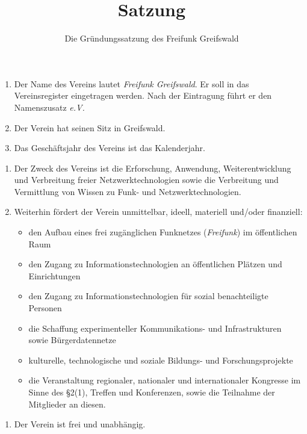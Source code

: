 \documentclass[parskip=half]{scrartcl}
\begin{document}
	\title{Satzung} 
	\author{Die Gründungssatzung des Freifunk Greifswald}
	\date{}
	\maketitle
	\begin{contract}
		\begin{enumerate}
			\item Der Name des Vereins lautet \textit{Freifunk Greifswald}. Er soll in das Vereinsregister eingetragen werden. Nach der Eintragung führt er den Namenszusatz \textit{e.V.}
			\item Der Verein hat seinen Sitz in Greifswald.
			\item Das Geschäftsjahr des Vereins ist das Kalenderjahr.
		\end{enumerate}
		\begin{enumerate}
			\item Der Zweck des Vereins ist die Erforschung, Anwendung, Weiterentwicklung und Verbreitung freier Netzwerktechnologien sowie die Verbreitung und Vermittlung von Wissen zu Funk- und Netzwerktechnologien.
			\item Weiterhin fördert der Verein unmittelbar, ideell, materiell und/oder finanziell:
			\begin{itemize}
				\item den Aufbau eines frei zugänglichen Funknetzes (\textit{Freifunk}) im öffentlichen Raum
				\item den Zugang zu Informationstechnologien an öffentlichen Plätzen und Einrichtungen
				\item den Zugang zu Informationstechnologien für sozial benachteiligte Personen
				\item die Schaffung experimenteller Kommunikations- und Infrastrukturen sowie Bürgerdatennetze
				\item kulturelle, technologische und soziale Bildungs- und Forschungsprojekte
				\item die Veranstaltung regionaler, nationaler und internationaler Kongresse im Sinne des §2(1), Treffen und Konferenzen, sowie die Teilnahme der Mitglieder an diesen.
			\end{itemize}
		\end{enumerate}
		\begin{enumerate}
			\item Der Verein ist frei und unabhängig.

\end{enumerate}
\end{contract}
\end{document}
